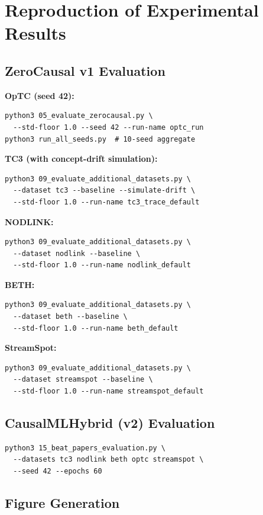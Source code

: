 \section{Reproduction of Experimental Results}

\subsection{ZeroCausal v1 Evaluation}

\textbf{OpTC (seed 42):}
\begin{lstlisting}
python3 05_evaluate_zerocausal.py \
  --std-floor 1.0 --seed 42 --run-name optc_run
python3 run_all_seeds.py  # 10-seed aggregate
\end{lstlisting}

\textbf{TC3 (with concept-drift simulation):}
\begin{lstlisting}
python3 09_evaluate_additional_datasets.py \
  --dataset tc3 --baseline --simulate-drift \
  --std-floor 1.0 --run-name tc3_trace_default
\end{lstlisting}

\textbf{NODLINK:}
\begin{lstlisting}
python3 09_evaluate_additional_datasets.py \
  --dataset nodlink --baseline \
  --std-floor 1.0 --run-name nodlink_default
\end{lstlisting}

\textbf{BETH:}
\begin{lstlisting}
python3 09_evaluate_additional_datasets.py \
  --dataset beth --baseline \
  --std-floor 1.0 --run-name beth_default
\end{lstlisting}

\textbf{StreamSpot:}
\begin{lstlisting}
python3 09_evaluate_additional_datasets.py \
  --dataset streamspot --baseline \
  --std-floor 1.0 --run-name streamspot_default
\end{lstlisting}

\subsection{CausalMLHybrid (v2) Evaluation}

\begin{lstlisting}
python3 15_beat_papers_evaluation.py \
  --datasets tc3 nodlink beth optc streamspot \
  --seed 42 --epochs 60
\end{lstlisting}

\subsection{Figure Generation}

